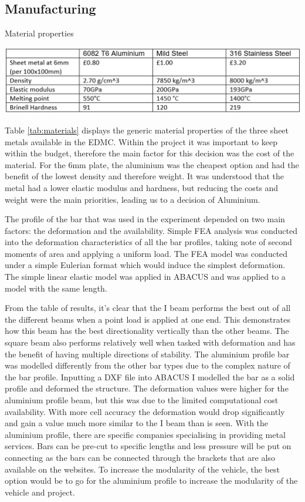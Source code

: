 \subsection{Manufacturing}
\begin{table}[!htbp]
    \centering
    \caption{Material properties}
    \includegraphics[width = \linewidth]{images/part8/materials.png}
    \label{tab:materials}
\end{table}

Table \ref{tab:materials} displays the generic material properties of the three sheet metals available in the EDMC. Within the project it was important to keep within the budget, therefore the main factor for this decision was the cost of the material. For the 6mm plate, the aluminium was the cheapest option and had the benefit of the lowest density and therefore weight. It was understood that the metal had a lower elastic modulus and hardness, but reducing the costs and weight were the main priorities, leading us to a decision of Aluminium.

The profile of the bar that was used in the experiment depended on two main factors: the deformation and the availability. Simple FEA analysis was conducted into the deformation characteristics of all the bar profiles, taking note of second moments of area and applying a uniform load. The FEA model was conducted under a simple Eulerian format which would induce the simplest deformation. The simple linear elastic model was applied in ABACUS and was applied to a model with the same length.


From the table of results, it’s clear that the I beam performs the best out of all the different beams when a point load is applied at one end. This demonstrates how this beam has the best directionality vertically than the other beams. The square beam also performs relatively well when tasked with deformation and has the benefit of having multiple directions of stability. The aluminium profile bar was modelled differently from the other bar types due to the complex nature of the bar profile. Inputting a DXF file into ABACUS I modelled the bar as a solid profile and deformed the structure. The deformation values were higher for the aluminium profile beam, but this was due to the limited computational cost availability. With more cell accuracy the deformation would drop significantly and gain a value much more similar to the I beam than is seen. With the aluminium profile, there are specific companies specialising in providing metal services. Bars can be pre-cut to specific lengths and less pressure will be put on connecting as the bars can be connected through the brackets that are also available on the websites. To increase the modularity of the vehicle, the best option would be to go for the aluminium profile to increase the modularity of the vehicle and project.

